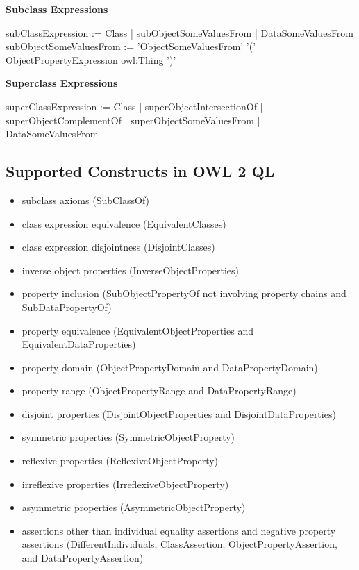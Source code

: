 \documentclass{llncs}
\begin{document}
\textbf{Subclass Expressions}

\begin{ex}
subClassExpression :=
    Class |
    subObjectSomeValuesFrom | DataSomeValuesFrom
subObjectSomeValuesFrom := 'ObjectSomeValuesFrom' '(' ObjectPropertyExpression owl:Thing ')'
\end{ex}

\textbf{Superclass Expressions}

\begin{ex}
superClassExpression :=
    Class |
    superObjectIntersectionOf | superObjectComplementOf |
    superObjectSomeValuesFrom | DataSomeValuesFrom
\end{ex}
 
\subsection{Supported Constructs in OWL 2 QL}

\begin{itemize}
	\item subclass axioms (SubClassOf)
  \item class expression equivalence (EquivalentClasses)
  \item class expression disjointness (DisjointClasses)
  \item inverse object properties (InverseObjectProperties)
  \item property inclusion (SubObjectPropertyOf not involving property chains and SubDataPropertyOf)
  \item property equivalence (EquivalentObjectProperties and EquivalentDataProperties)
  \item property domain (ObjectPropertyDomain and DataPropertyDomain)
  \item property range (ObjectPropertyRange and DataPropertyRange)
  \item disjoint properties (DisjointObjectProperties and DisjointDataProperties)
  \item symmetric properties (SymmetricObjectProperty)
  \item reflexive properties (ReflexiveObjectProperty)
  \item irreflexive properties (IrreflexiveObjectProperty)
  \item asymmetric properties (AsymmetricObjectProperty)
  \item assertions other than individual equality assertions and negative property assertions (DifferentIndividuals, ClassAssertion, ObjectPropertyAssertion, and DataPropertyAssertion) 
\end{itemize}
\end{document}
